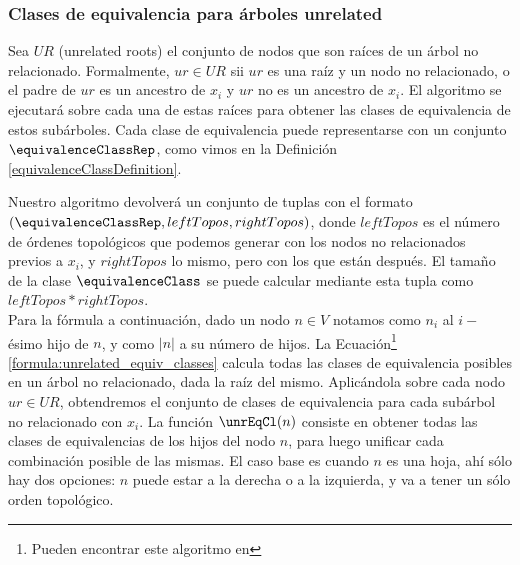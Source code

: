 
\subsubsection{Clases de equivalencia para árboles unrelated}

Sea $UR$ (unrelated roots) el conjunto de nodos que son raíces de un árbol no relacionado. Formalmente, $ur \in UR$ sii $ur$ es una raíz y un nodo no relacionado, o el padre de $ur$ es un ancestro de $x_i$ y $ur$ no es un ancestro de $x_i$. El algoritmo se ejecutará sobre cada una de estas raíces para obtener las clases de equivalencia de estos subárboles. Cada clase de equivalencia puede representarse con un conjunto $\equivalenceClassRep$, como vimos en la Definición \ref{equivalenceClassDefinition}. 



Nuestro algoritmo devolverá un conjunto de tuplas con el formato $(\equivalenceClassRep, leftTopos, rightTopos)$, donde $leftTopos$ es el número de órdenes topológicos que podemos generar con los nodos no relacionados previos a $x_i$, y $rightTopos$ lo mismo, pero con los que están después. El tamaño de la clase $\equivalenceClass$ se puede calcular mediante esta tupla como $leftTopos * rightTopos$.\\


Para la fórmula a continuación, dado un nodo $n \in V$ notamos como $n_i$ al $i-$ésimo hijo de $n$, y como $|n|$ a su número de hijos. La Ecuación\footnote{Pueden encontrar este algoritmo en } \ref{formula:unrelated_equiv_classes} calcula todas las clases de equivalencia posibles en un árbol no relacionado, dada la raíz del mismo. Aplicándola sobre cada nodo $ur \in UR$, obtendremos el conjunto de clases de equivalencia para cada subárbol no relacionado con $x_i$. La función $\unrEqCl(n)$ consiste en obtener todas las clases de equivalencias de los hijos del nodo $n$, para luego unificar cada combinación posible de las mismas. El caso base es cuando $n$ es una hoja, ahí sólo hay dos opciones: $n$ puede estar a la derecha o a la izquierda, y va a tener un sólo orden topológico. 

